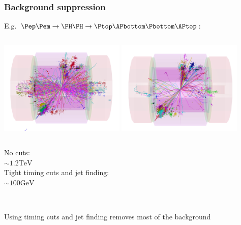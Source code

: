 \documentclass{beamer}
\begin{document}
\begin{frame}
\frametitle{Background suppression}
E.g. $\Pep\Pem\to\PH\PH\to\Ptop\APbottom\Pbottom\APtop$:
\begin{columns}[c]
\column{6cm}
\centering
\includegraphics[width=6cm]{../SIDWorkshop/HH2.pdf}
\column{6cm}
\centering
\includegraphics[width=6cm]{../SIDWorkshop/HH2tight.pdf}
\end{columns}
\begin{columns}[c]
\column{6cm}
\centering
No cuts:\\ \alert{$\sim1.2\textrm{TeV}$}\\
{\color{blue}{\scriptsize 10ns window}}
\column{6cm}
\centering
Tight timing cuts and jet finding:\\ \alert{$\sim100\textrm{GeV}$}
\end{columns}
~\\
\alert{Using timing cuts and jet finding removes most of the background}
\end{frame}
\end{document}
